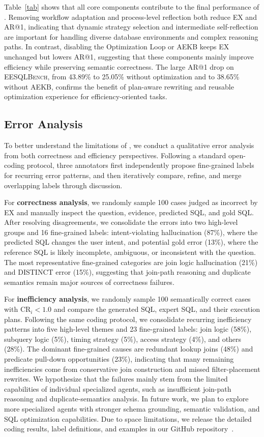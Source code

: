 Table~\ref{tab} shows that all core components contribute to the final performance of \toolname.
Removing workflow adaptation and process-level reflection both reduce EX and AR@1, indicating that dynamic strategy selection and intermediate self-reflection are important for handling diverse database environments and complex reasoning paths.
In contrast, disabling the Optimization Loop or AEKB keeps EX unchanged but lowers AR@1, suggesting that these components mainly improve efficiency while preserving semantic correctness.
The large AR@1 drop on \textsc{EESQLBench}, from 43.89\% to 25.05\% without optimization and to 38.65\% without AEKB, confirms the benefit of plan-aware rewriting and reusable optimization experience for efficiency-oriented tasks.

\subsection{Error Analysis}

To better understand the limitations of \toolname, we conduct a qualitative error analysis from both correctness and efficiency perspectives.
Following a standard open-coding protocol, three annotators first independently propose fine-grained labels for recurring error patterns, and then iteratively compare, refine, and merge overlapping labels through discussion.

For \textbf{correctness analysis}, we randomly sample 100 cases judged as incorrect by EX and manually inspect the question, evidence, predicted SQL, and gold SQL.
After resolving disagreements, we consolidate the errors into two high-level groups and 16 fine-grained labels: intent-violating hallucination (87\%), where the predicted SQL changes the user intent, and potential gold error (13\%), where the reference SQL is likely incomplete, ambiguous, or inconsistent with the question.
The most representative fine-grained categories are join logic hallucination (21\%) and DISTINCT error (15\%), suggesting that join-path reasoning and duplicate semantics remain major sources of correctness failures.

For \textbf{inefficiency analysis}, we randomly sample 100 semantically correct cases with $\mathrm{CR}_i < 1.0$ and compare the generated SQL, expert SQL, and their execution plans.
Following the same coding protocol, we consolidate recurring inefficiency patterns into five high-level themes and 23 fine-grained labels: join logic (58\%), subquery logic (5\%), timing strategy (5\%), access strategy (4\%), and others (28\%).
The dominant fine-grained causes are redundant lookup joins (48\%) and predicate pull-down opportunities (23\%), indicating that many remaining inefficiencies come from conservative join construction and missed filter-placement rewrites.
We hypothesize that the failures mainly stem from the limited capabilities of individual specialized agents, such as insufficient join-path reasoning and duplicate-semantics analysis.
In future work, we plan to explore more specialized agents with stronger schema grounding, semantic validation, and SQL optimization capabilities.
Due to space limitations, we release the detailed coding results, label definitions, and examples in our GitHub repository~\cite{optsql_error_analysis}.


\endgroup
